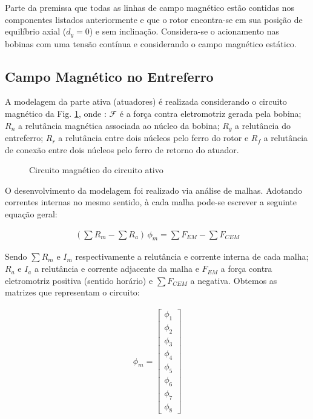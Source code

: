 Parte da premissa que todas as linhas de campo magnético estão contidas nos componentes listados anteriormente e que o rotor encontra-se em sua posição de equilíbrio axial ($d_y = 0$) e sem inclinação. Considera-se o acionamento nas bobinas com uma tensão contínua e considerando o campo magnético estático.

\subsection{Campo Magnético no Entreferro}

A modelagem da parte ativa (atuadores) é realizada considerando o circuito magnético da Fig. \ref{Fig:modelagem:ativo:circuito2}, onde : $\mathcal{F}$ é a força contra eletromotriz gerada pela bobina; $R_n$ a relutância magnética associada ao núcleo da bobina; $R_g$ a relutância do entreferro; $R_r$ a relutância entre dois núcleos pelo ferro do rotor e $R_f$ a relutância de conexão entre dois núcleos pelo ferro de retorno do atuador.

\begin{figure}[h!]
	
	\caption{Circuito magnético do circuito ativo}		\label{Fig:modelagem:ativo:circuito2}
\end{figure}

O desenvolvimento da modelagem foi realizado via análise de malhas. Adotando correntes internas no mesmo sentido, à cada malha pode-se escrever a seguinte equação geral:

\begin{align}
	(\sum R_m  - \sum  R_a ) \, \phi_m = \sum F_{EM} - \sum F_{CEM}
\end{align}

Sendo $\sum R_m$ e $I_m$  respectivamente a relutância e corrente interna de cada malha; $R_a$ e $I_{a}$ a relutância e corrente adjacente da malha e $F_{EM}$ a força contra eletromotriz positiva (sentido horário) e $\sum F_{CEM}$ a negativa. Obtemos as matrizes que representam o circuito:

\begin{align}
	\phi_m = 
	\begin{bmatrix}
	\phi_1 \\ \phi_2 \\  \phi_3 \\  \phi_4 \\  \phi_5 \\  \phi_6 \\  \phi_7 \\  \phi_8
	\end{bmatrix}
\end{align}

